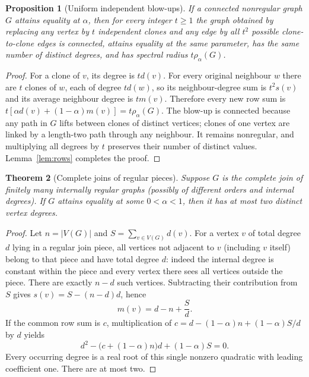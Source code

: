 \documentclass[11pt]{amsart}
\newtheorem{theorem}{Theorem}[section]
\newtheorem{proposition}[theorem]{Proposition}
\theoremstyle{remark}
\begin{document}
\begin{proposition}[Uniform independent blow-ups]\label{prop:blow}
If a connected nonregular graph $G$ attains equality at $\alpha$,
then for every integer $t\geq1$ the graph obtained by replacing
any vertex by $t$ independent clones and any edge by all $t^2$
possible clone-to-clone edges is connected, attains equality at the
same parameter, has the same number of distinct degrees, and has
spectral radius $t\rho_\alpha(G)$.
\end{proposition}
\begin{proof}
For a clone of $v$, its degree is $td(v)$. For every original
neighbour $w$ there are $t$ clones of $w$, each of degree $td(w)$,
so its neighbour-degree sum is $t^2s(v)$ and its average neighbour
degree is $tm(v)$. Therefore every new row sum is
$t[\alpha d(v)+(1-\alpha)m(v)]=t\rho_\alpha(G)$.
The blow-up is connected because any path in $G$ lifts between
clones of distinct vertices; clones of one vertex are linked by a
length-two path through any neighbour. It remains nonregular, and
multiplying all degrees by $t$ preserves their number of distinct
values. Lemma~\ref{lem:rows} completes the proof.
\end{proof}

\begin{theorem}[Complete joins of regular pieces]\label{thm:joins}
Suppose $G$ is the complete join of finitely many internally regular
graphs (possibly of different orders and internal degrees).
If $G$ attains equality at some $0<\alpha<1$, then it has at most
two distinct vertex degrees.
\end{theorem}
\begin{proof}
Let $n=|V(G)|$ and $S=\sum_{v\in V(G)}d(v)$.
For a vertex $v$ of total degree $d$ lying in a regular join piece,
all vertices not adjacent to $v$ (including $v$ itself) belong
to that piece and have total degree $d$: indeed the internal
degree is constant within the piece and every vertex there sees
all vertices outside the piece. There are exactly $n-d$ such
vertices. Subtracting their contribution from $S$ gives
$s(v)=S-(n-d)d$, hence
\[
 m(v)=d-n+\frac Sd.
\]
If the common row sum is $c$, multiplication of
$c=d-(1-\alpha)n+(1-\alpha)S/d$ by $d$ yields
\[
 d^2-\bigl(c+(1-\alpha)n\bigr)d+(1-\alpha)S=0.
\]
Every occurring degree is a real root of this single nonzero
quadratic with leading coefficient one. There are at most two.
\end{proof}
\end{document}
